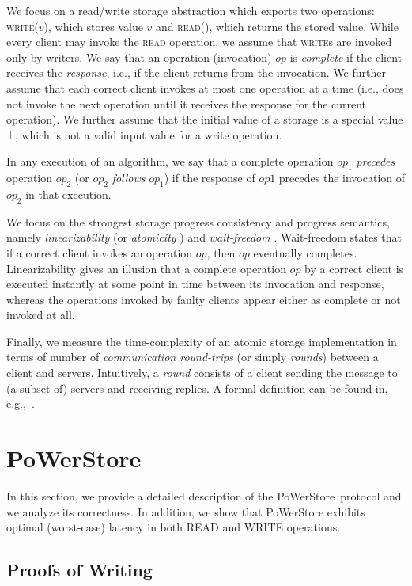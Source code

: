 \documentclass[10pt,conference,compsocconf]{IEEEtran}
\newcommand{\protocol}{PoWerStore}
\begin{document}
We focus on a read/write storage abstraction \cite{Lam86} which exports two operations: \textsc{write}($v$), which stores value $v$ and \textsc{read}(), which returns the stored value. While every client may invoke the \textsc{read} operation, we assume that \textsc{write}s are invoked only by writers. We say that an
operation (invocation) $op$ is \emph{complete} if the client receives the \emph{response}, i.e., if the client returns from the invocation. We further assume that each correct client invokes at most one operation at a time (i.e., does not invoke the next operation
until it receives the response for the current operation).
We further assume that the initial value of a storage is a special value $\bot$, which is not a
valid input value for a write operation.

In any execution of an algorithm, we say that a complete
operation $op_1$ \emph{precedes} operation $op_2$ (or $op_2$ \emph{follows} $op_1$)
if the response of $op1$ precedes the invocation of
$op_2$ in that execution.


We focus on the strongest storage progress consistency and progress semantics, namely \emph{linearizability} \cite{HW90} (or \emph{atomicity} \cite{Lam86}) and \emph{wait-freedom} \cite{Her91}.
Wait-freedom states that if a correct client invokes an operation $op$, then
$op$ eventually completes. Linearizability gives an illusion that a complete operation $op$ by a correct client is executed instantly at some point in time between its invocation and response,  whereas the operations invoked by faulty clients appear either as complete or not invoked at all.

Finally, we measure the time-complexity of an atomic storage
implementation in terms of number of \emph{communication round-trips}
(or simply \emph{rounds}) between a client and servers. Intuitively, a \emph{round} consists of a client sending the message to (a subset of) servers and receiving replies. A formal definition can be found in, e.g.,~\cite{GNS09,DGLV10}.


\section{\protocol}\label{sec:pow}
In this section, we provide a detailed description of the \protocol\ protocol and we analyze its correctness. In addition, we show that \protocol{} exhibits
optimal (worst-case) latency in both \textsc{READ} and \textsc{WRITE} operations.

\subsection{Proofs of Writing}
\end{document}
